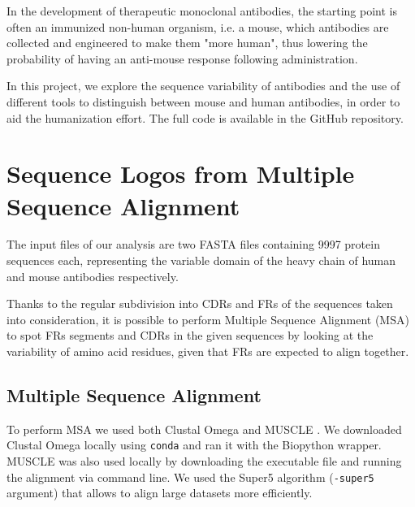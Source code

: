 \documentclass[11pt]{article}
\begin{document}

In the development of therapeutic monoclonal antibodies, the starting point is often an immunized non-human organism, i.e. a mouse, which antibodies are collected and engineered to make them "more human", thus lowering the probability of having an anti-mouse response following administration. 

In this project, we explore the sequence variability of antibodies and the use of different tools to distinguish between mouse and human antibodies, in order to aid the humanization effort. The full code is available in the GitHub repository.



\section{Sequence Logos from Multiple Sequence Alignment}

The input files of our analysis are two FASTA files containing 9997 protein sequences each, representing the variable domain of the heavy chain of human and mouse antibodies respectively.

Thanks to the regular subdivision into CDRs and FRs of the sequences taken into consideration, it is possible to perform Multiple Sequence Alignment (MSA) to spot FRs segments and CDRs in the given sequences by looking at the variability of amino acid residues, given that FRs are expected to align together.


\subsection{Multiple Sequence Alignment}

To perform MSA we used both Clustal Omega \cite{clustal} and MUSCLE \cite{muscle}.
We downloaded Clustal Omega locally using \verb|conda| and ran it with the Biopython wrapper.
MUSCLE was also used locally by downloading the executable file and running the alignment via command line. We used the Super5 algorithm (\verb|-super5| argument) that allows to align large datasets more efficiently.
\end{document}
